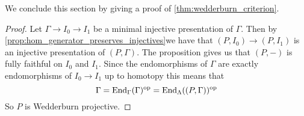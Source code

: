 We conclude this section by giving a proof of \cref{thm:wedderburn_criterion}.

\Wederburncriterion*
\begin{proof}
	Let $\Gamma \to I_0 \to I_1$ be a minimal injective presentation of $\Gamma$. Then by \cref{prop:hom_generator_preserves_injectives}we have that $(P, I_0) \to (P,I_1)$ is an injective presentation of $(P,\Gamma)$. The proposition gives us that $(P,-)$ is fully faithful on $I_0$ and $I_1$. Since the endomorphisms of $\Gamma$ are exactly endomorphisms of $I_0 \to I_1$ up to homotopy this means that $$\Gamma=\operatorname{End}_\Gamma(\Gamma)^{\operatorname{op}} = \operatorname{End}_\Lambda((P, \Gamma))^{\operatorname{op}}$$
	So $P$ is Wedderburn projective.
\end{proof}
